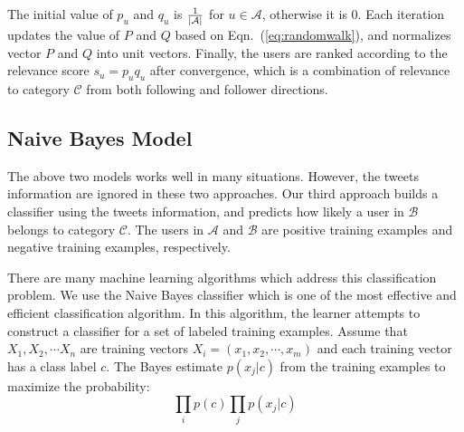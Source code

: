 \documentclass{article}
\begin{document}
The initial value of $p_u$ and $q_u$ is ${1 \over |\mathcal{A}|}$ for $u \in \mathcal{A}$, otherwise it is 0. Each iteration updates the value of $P$ and $Q$ based on Eqn.~(\ref{eq:randomwalk}), and normalizes vector $P$ and $Q$ into unit vectors. Finally, the users are ranked according to the relevance score $s_u = p_u q_u$ after convergence, which is a combination of relevance to category $\mathcal{C}$ from both following and follower directions.

\subsection{Naive Bayes Model}

The above two models works well in many situations. However, the tweets information are ignored in these two approaches. Our third approach builds a classifier using the tweets information, and predicts how likely a user in $\mathcal{B}$ belongs to category $\mathcal{C}$. The users in $\mathcal{A}$ and $\mathcal{B}$ are positive training examples and negative training examples, respectively.


There are many machine learning algorithms which address this classification problem. We use the Naive Bayes classifier which is one of the most effective and efficient classification algorithm. In this algorithm, the learner attempts to construct a classifier for a set of labeled training examples.
Assume that $X_1, X_2, \cdots X_n$ are training vectors $X_i=(x_1, x_2, \cdots, x_m)$ and each training vector has a class label $c$. The Bayes estimate $p(x_j|c)$ from the training examples to maximize the probability:
$$\prod_i p(c)\prod_jp(x_j|c)$$
\end{document}
